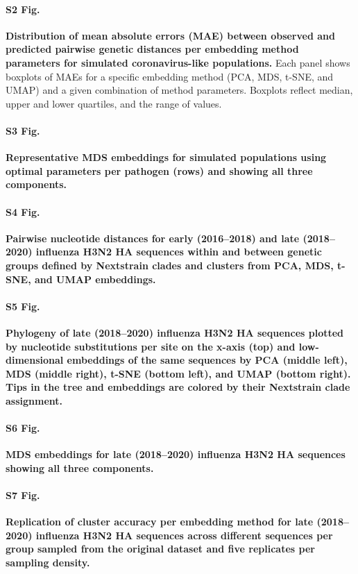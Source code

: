\documentclass[10pt,letterpaper]{article}
\begin{document}
\paragraph*{S2 Fig.}
\label{S2_Fig_simulated_coronavirus_errors}
{\bf Distribution of mean absolute errors (MAE) between observed and predicted pairwise genetic distances per embedding method parameters for simulated coronavirus-like populations.} Each panel shows boxplots of MAEs for a specific embedding method (PCA, MDS, t-SNE, and UMAP) and a given combination of method parameters. Boxplots reflect median, upper and lower quartiles, and the range of values.

\paragraph*{S3 Fig.}
\label{S3_Fig_simulated_representative_mds_embeddings}
{\bf Representative MDS embeddings for simulated populations using optimal parameters per pathogen (rows) and showing all three components.}

\paragraph*{S4 Fig.}
\label{S4_Fig_flu_within_between_group_distances}
{\bf Pairwise nucleotide distances for early (2016--2018) and late (2018--2020) influenza H3N2 HA sequences within and between genetic groups defined by Nextstrain clades and clusters from PCA, MDS, t-SNE, and UMAP embeddings.}

\paragraph*{S5 Fig.}
\label{S5_Fig_late_flu_embeddings_by_clade}
{\bf Phylogeny of late (2018--2020) influenza H3N2 HA sequences plotted by nucleotide substitutions per site on the x-axis (top) and low-dimensional embeddings of the same sequences by PCA (middle left), MDS (middle right), t-SNE (bottom left), and UMAP (bottom right).
  Tips in the tree and embeddings are colored by their Nextstrain clade assignment.}

\paragraph*{S6 Fig.}
\label{S6_Fig_late_flu_mds_embeddings}
{\bf MDS embeddings for late (2018--2020) influenza H3N2 HA sequences showing all three components.}

\paragraph*{S7 Fig.}
\label{S7_Fig_late_flu_replication_of_cluster_accuracy}
{\bf Replication of cluster accuracy per embedding method for late (2018--2020) influenza H3N2 HA sequences across different sequences per group sampled from the original dataset and five replicates per sampling density.}
\end{document}
